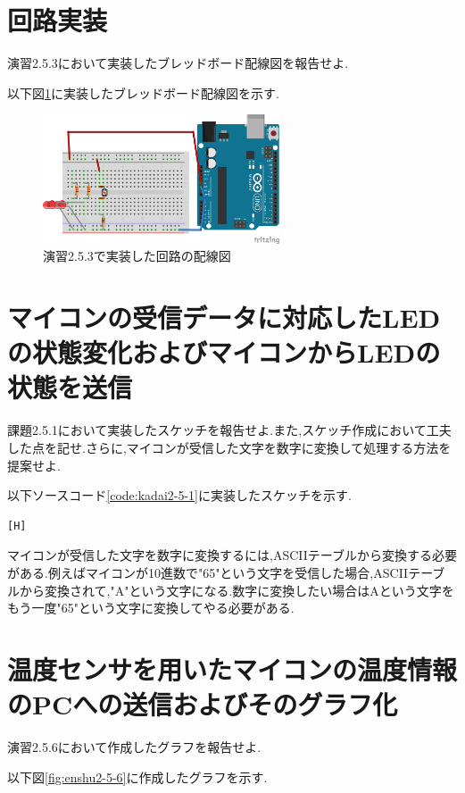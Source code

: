 \documentclass{jarticle}
\begin{document}
\section{回路実装}
演習2.5.3において実装したブレッドボード配線図を報告せよ.

以下図\ref{fig:2-5-3bread}に実装したブレッドボード配線図を示す.


\begin{figure}[H]
\begin{center}
\includegraphics[width=7.0cm]{images/2-5-3bread.png}
\caption{演習2.5.3で実装した回路の配線図}
\label{fig:2-5-3bread}
\end{center}
\end{figure}

\section{マイコンの受信データに対応したLEDの状態変化およびマイコンからLEDの状態を送信}
課題2.5.1において実装したスケッチを報告せよ.また,スケッチ作成において工夫した点を記せ.さらに,マイコンが受信した文字を数字に変換して処理する方法を提案せよ.

以下ソースコード\ref{code:kadai2-5-1}に実装したスケッチを示す.
\begin{lstlisting}[caption = 課題2.5.1,label=code:kadai2-5-1][H]

\end{lstlisting}

マイコンが受信した文字を数字に変換するには,ASCIIテーブルから変換する必要がある.例えばマイコンが10進数で"65"という文字を受信した場合,ASCIIテーブルから変換されて,"A"という文字になる.数字に変換したい場合はAという文字をもう一度"65"という文字に変換してやる必要がある.

\section{温度センサを用いたマイコンの温度情報のPCへの送信およびそのグラフ化}
演習2.5.6において作成したグラフを報告せよ.

以下図\ref{fig:enshu2-5-6}に作成したグラフを示す.
\end{document}
